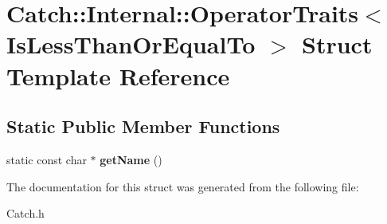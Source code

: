 \hypertarget{struct_catch_1_1_internal_1_1_operator_traits_3_01_is_less_than_or_equal_to_01_4}{\section{Catch\-:\-:Internal\-:\-:Operator\-Traits$<$ Is\-Less\-Than\-Or\-Equal\-To $>$ Struct Template Reference}
\label{struct_catch_1_1_internal_1_1_operator_traits_3_01_is_less_than_or_equal_to_01_4}
}
\subsection*{Static Public Member Functions}
\begin{DoxyCompactItemize}
\item 
\hypertarget{struct_catch_1_1_internal_1_1_operator_traits_3_01_is_less_than_or_equal_to_01_4_ae8578813bc847838f10448c1541a9d7b}{static const char $\ast$ {\bfseries get\-Name} ()}\label{struct_catch_1_1_internal_1_1_operator_traits_3_01_is_less_than_or_equal_to_01_4_ae8578813bc847838f10448c1541a9d7b}

\end{DoxyCompactItemize}


The documentation for this struct was generated from the following file\-:\begin{DoxyCompactItemize}
\item 
Catch.\-h\end{DoxyCompactItemize}
